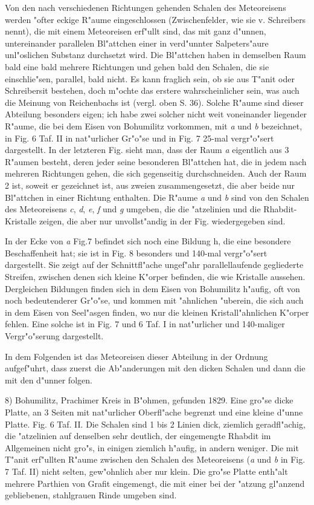 \documentclass[a4paper, 11pt, oneside, german]{article}
\begin{document}
Von den nach verschiedenen Richtungen gehenden Schalen des Meteoreisens werden "ofter eckige R"aume eingeschlossen (Zwischenfelder, wie sie v. Schreibers nennt), die mit einem Meteoreisen erf"ullt sind, das mit ganz d"unnen, untereinander parallelen Bl"attchen einer in verd"unnter Salpeters"aure unl"oslichen Substanz durchsetzt wird. Die Bl"attchen haben in demselben Raum bald eine bald mehrere Richtungen und gehen bald den Schalen, die sie einschlie"sen, parallel, bald nicht. Es kann fraglich sein, ob sie aus T"anit oder Schreibersit bestehen, doch m"ochte das erstere wahrscheinlicher sein, was auch die Meinung von Reichenbachs ist (vergl. oben S. 36). Solche R"aume sind dieser Abteilung besonders eigen; ich habe zwei solcher nicht weit voneinander liegender R"aume, die bei dem Eisen von Bohumilitz vorkommen, mit \emph{a} und \emph{b} bezeichnet, in Fig. 6 Taf. II in nat"urlicher Gr"o"se und in Fig. 7 25-mal vergr"o"sert dargestellt. In der letzteren Fig. sieht man, dass der Raum \emph{a} eigentlich aus 3 R"aumen besteht, deren jeder seine besonderen Bl"attchen hat, die in jedem nach mehreren Richtungen gehen, die sich gegenseitig durchschneiden. Auch der Raum 2 ist, soweit er gezeichnet ist, aus zweien zusammengesetzt, die aber beide nur Bl"attchen in einer Richtung enthalten. Die R"aume \emph{a} und \emph{b} sind von den Schalen des Meteoreisens \emph{c}, \emph{d}, \emph{e}, \emph{f} und \emph{g} umgeben, die die "atzelinien und die Rhabdit-Kristalle zeigen, die aber nur unvollst"andig in der Fig. wiedergegeben sind.

In der Ecke von \emph{a} Fig.7 befindet sich noch eine Bildung h, die eine besondere Beschaffenheit hat; sie ist in Fig. 8 besonders und 140-mal vergr"o"sert dargestellt. Sie zeigt auf der Schnittfl"ache ungef"ahr parallellaufende gegliederte Streifen, zwischen denen sich kleine K"orper befinden, die wie Kristalle aussehen. Dergleichen Bildungen finden sich in dem Eisen von Bohumilitz h"aufig, oft von noch bedeutenderer Gr"o"se, und kommen mit "ahnlichen "uberein, die sich auch in dem Eisen von Seel"asgen finden, wo nur die kleinen Kristall"ahnlichen K"orper fehlen. Eine solche ist in Fig. 7 und 6 Taf. I in nat"urlicher und 140-maliger Vergr"o"serung dargestellt.

In dem Folgenden ist das Meteoreisen dieser Abteilung in der Ordnung aufgef"uhrt, dass zuerst die Ab"anderungen mit den dicken Schalen und dann die mit den d"unner folgen.

8) Bohumilitz, Prachimer Kreis in B"ohmen, gefunden 1829. Eine gro"se dicke Platte, an 3 Seiten mit nat"urlicher Oberfl"ache begrenzt und eine kleine d"unne Platte. Fig. 6 Taf. II. Die Schalen sind 1 bis 2 Linien dick, ziemlich geradfl"achig, die "atzelinien auf denselben sehr deutlich, der eingemengte Rhabdit im Allgemeinen nicht gro"s, in einigen ziemlich h"aufig, in andern weniger. Die mit T"anit erf"ullten R"aume zwischen den Schalen des Meteoreisens (\emph{a} und \emph{b} in Fig. 7 Taf. II) nicht selten, gew"ohnlich aber nur klein. Die gro"se Platte enth"alt mehrere Parthien von Grafit eingemengt, die mit einer bei der "atzung gl"anzend gebliebenen, stahlgrauen Rinde umgeben sind.
\end{document}
